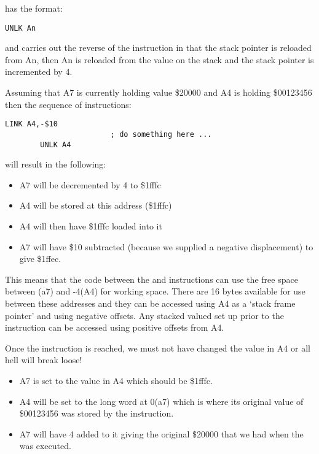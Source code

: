  has the format:

\begin{lstlisting}[firstnumber=1,]
        UNLK An
\end{lstlisting}

and carries out the reverse of the  instruction in that the
      stack pointer is reloaded from An, then An is reloaded from the value on
      the stack and the stack pointer is incremented by 4.

Assuming that A7 is currently holding value \$20000 and A4 is
      holding \$00123456 then the sequence of instructions:

\begin{lstlisting}[firstnumber=1,]
        LINK A4,-$10
                        ; do something here ...
        UNLK A4
\end{lstlisting}

will result in the following:
\begin{itemize}[itemsep=0pt]

\item{}A7 will be decremented by 4 to \$1fffc


\item{}A4 will be stored at this address (\$1fffc)


\item{}A4 will then have \$1fffc loaded into it


\item{}A7 will have \$10 subtracted (because we supplied a negative
          displacement) to give \$1ffec.

\end{itemize}

This means that the code between the  and  instructions
      can use the free space between (a7) and -{}4(A4) for working space. There
      are 16 bytes available for use between these addresses and they can be
      accessed using A4 as a `stack frame pointer' and using negative
      offsets. Any stacked valued set up prior to the  instruction can be accessed using positive offsets from A4.

Once the  instruction is reached, we must not have changed the
      value in A4 or all hell will break loose!
\begin{itemize}[itemsep=0pt]

\item{}A7 is set to the value in A4 which should be \$1fffc.


\item{}A4 will be set to the long word at 0(a7) which is where its
          original value of \$00123456 was stored by the 
          instruction.


\item{}A7 will have 4 added to it giving the original \$20000 that we
          had when the  was executed.

\end{itemize}

